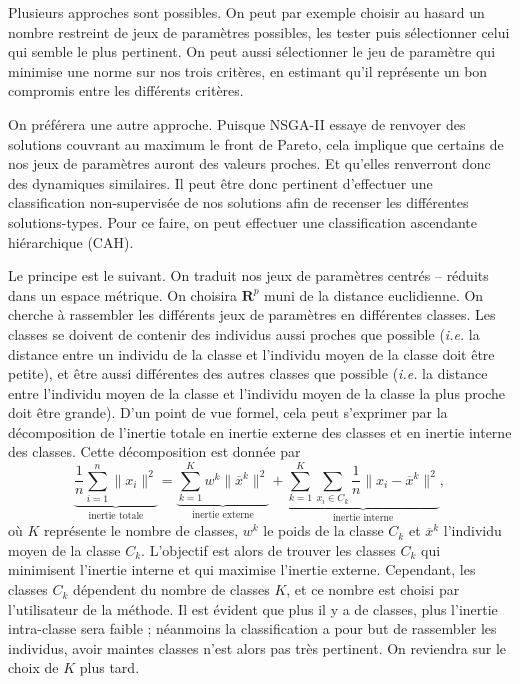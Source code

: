 Plusieurs approches sont possibles.
On peut par exemple choisir au hasard un nombre restreint de jeux de paramètres possibles, les tester puis sélectionner celui qui semble le plus pertinent.
On peut aussi sélectionner le jeu de paramètre qui minimise une norme sur nos trois critères, en estimant qu'il représente un bon compromis entre les différents critères.

On préférera une autre approche. 
Puisque NSGA-II essaye de renvoyer des solutions couvrant au maximum le front de Pareto, cela implique que certains de nos jeux de paramètres auront des valeurs proches.
Et qu'elles renverront donc des dynamiques similaires.
Il peut être donc pertinent d'effectuer une classification non-supervisée de nos solutions afin de recenser les différentes solutions-types.
Pour ce faire, on peut effectuer une classification ascendante hiérarchique (CAH).

Le principe est le suivant.
On traduit nos jeux de paramètres centrés -- réduits dans un espace métrique. On choisira $\mathbf{R}^p$ muni de la distance euclidienne.
On cherche à rassembler les différents jeux de paramètres en différentes classes.
Les classes se doivent de contenir des individus aussi proches que possible (\emph{i.e.} la distance entre un individu de la classe et l'individu moyen de la classe doit être petite), et être aussi différentes des autres classes que possible (\emph{i.e.} la distance entre l'individu moyen de la classe et l'individu moyen de la classe la plus proche doit être grande).
D'un point de vue formel, cela peut s'exprimer par la décomposition de l'inertie totale en inertie externe des classes et en inertie interne des classes.
Cette décomposition est donnée par
\[
\underbrace{\frac{1}{n}\sum_{i=1}^{n} \lVert x_i \rVert^2}_{\text{inertie totale}} = \underbrace{\sum_{k=1}^{K}w^k\lVert \overline{x}^{k} \rVert^2}_{\text{inertie externe}} +
\underbrace{\sum_{k=1}^{K} \sum_{x_i\in C_k} \frac{1}{n} \lVert x_i - \overline{x}^k \rVert^2}_{\text{inertie interne}},
\]
où $K$ représente le nombre de classes, $w^k$ le poids de la classe $C_k$ et $\overline{x}^{k}$ l'individu moyen de la classe $C_k$.
L'objectif est alors de trouver les classes $C_k$ qui minimisent l'inertie interne et qui maximise l'inertie externe.
Cependant, les classes $C_k$ dépendent du nombre de classes $K$, et ce nombre est choisi par l'utilisateur de la méthode.
Il est évident que plus il y a de classes, plus l'inertie intra-classe sera faible ; néanmoins la classification a pour but de rassembler les individus, avoir maintes classes n'est alors pas très pertinent.
On reviendra sur le choix de $K$ plus tard.

